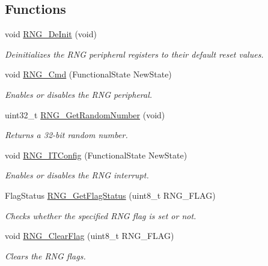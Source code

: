 \subsection*{Functions}
\begin{DoxyCompactItemize}
\item 
void \hyperlink{group___r_n_g_ga15ff5e649080076eebd51143b9ac4491}{R\-N\-G\-\_\-\-De\-Init} (void)
\begin{DoxyCompactList}\small\item\em Deinitializes the R\-N\-G peripheral registers to their default reset values. \end{DoxyCompactList}\item 
void \hyperlink{group___r_n_g_ga6c1a8372da6e8a06819903c63faecd7b}{R\-N\-G\-\_\-\-Cmd} (Functional\-State New\-State)
\begin{DoxyCompactList}\small\item\em Enables or disables the R\-N\-G peripheral. \end{DoxyCompactList}\item 
uint32\-\_\-t \hyperlink{group___r_n_g_ga2cead4780224fd74a3fc15543c98ed36}{R\-N\-G\-\_\-\-Get\-Random\-Number} (void)
\begin{DoxyCompactList}\small\item\em Returns a 32-\/bit random number. \end{DoxyCompactList}\item 
void \hyperlink{group___r_n_g_ga41d9be4c303ba0875a82c62dc7085f08}{R\-N\-G\-\_\-\-I\-T\-Config} (Functional\-State New\-State)
\begin{DoxyCompactList}\small\item\em Enables or disables the R\-N\-G interrupt. \end{DoxyCompactList}\item 
Flag\-Status \hyperlink{group___r_n_g_gab70d6cc7d943dfb8eac15ccecf6cd7b3}{R\-N\-G\-\_\-\-Get\-Flag\-Status} (uint8\-\_\-t R\-N\-G\-\_\-\-F\-L\-A\-G)
\begin{DoxyCompactList}\small\item\em Checks whether the specified R\-N\-G flag is set or not. \end{DoxyCompactList}\item 
void \hyperlink{group___r_n_g_gac3c67fe6bacdc4529f1707025224f954}{R\-N\-G\-\_\-\-Clear\-Flag} (uint8\-\_\-t R\-N\-G\-\_\-\-F\-L\-A\-G)
\begin{DoxyCompactList}\small\item\em Clears the R\-N\-G flags. \end{DoxyCompactList}\item 

\end{DoxyCompactItemize}
